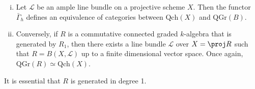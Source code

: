 \begin{theorem}
  \begin{enumerate}[(i)]
    \item Let \(\mathcal{L}\) be an ample line bundle on a projective scheme \(X\). Then the functor \(\bar{\Gamma}_h\) defines an equivalence of categories between \(\mathrm{Qch}(X)\) and \(\mathrm{QGr}(B)\).
    \item Conversely, if \(R\) is a commutative connected graded \(k\)-algebra that is generated by \(R_1\), then there exists a line bundle \(\mathcal{L}\) over \(X=\proj R\) such that \(R=B(X,\mathcal{L})\) up to a finite dimensional vector space. Once again, \(\mathrm{QGr}(R)\simeq \mathrm{Qch}(X)\).
  \end{enumerate}
\end{theorem}

\begin{remark}
     It is essential that \(R\) is generated in degree 1. 
\end{remark}